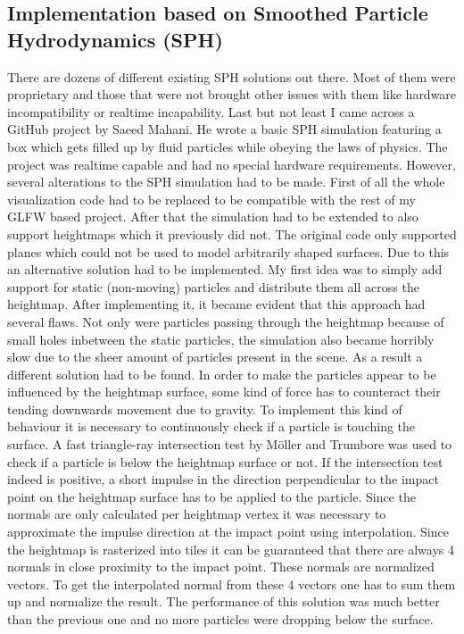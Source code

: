 \documentclass[11pt,a4paper,twoside,openright]{report}
\begin{document}
\subsection{Implementation based on Smoothed Particle Hydrodynamics (SPH)}
There are dozens of different existing SPH solutions out there. Most of them were proprietary and those that were not brought other issues with them like hardware incompatibility or realtime incapability. Last but not least I came across a GitHub project \cite{Mahani} by Saeed Mahani. He wrote a basic SPH simulation featuring a box which gets filled up by fluid particles while obeying the laws of physics. The project was realtime capable and had no special hardware requirements. However, several alterations to the SPH simulation had to be made. First of all the whole visualization code had to be replaced to be compatible with the rest of my GLFW based project. After that the simulation had to be extended to also support heightmaps which it previously did not. The original code only supported planes which could not be used to model arbitrarily shaped surfaces. Due to this an alternative solution had to be implemented. My first idea was to simply add support for static (non-moving) particles and distribute them all across the heightmap. After implementing it, it became evident that this approach had several flaws. Not only were particles passing through the heightmap because of small holes inbetween the static particles, the simulation also became horribly slow due to the sheer amount of particles present in the scene. As a result a different solution had to be found. In order to make the particles appear to be influenced by the heightmap surface, some kind of force has to counteract their tending downwards movement due to gravity. To implement this kind of behaviour it is necessary to continuously check if a particle is touching the surface. A fast triangle-ray intersection test by Möller and Trumbore \cite{moller2005fast} was used to check if a particle is below the heightmap surface or not. If the intersection test indeed is positive, a short impulse in the direction perpendicular to the impact point on the heightmap surface has to be applied to the particle. Since the normals are only calculated per heightmap vertex it was necessary to approximate the impulse direction at the impact point using interpolation. Since the heightmap is rasterized into tiles it can be guaranteed that there are always 4 normals in close proximity to the impact point. These normals are normalized vectors. To get the interpolated normal from these 4 vectors one has to sum them up and normalize the result. The performance of this solution was much better than the previous one and no more particles were dropping below the surface.
\end{document}
